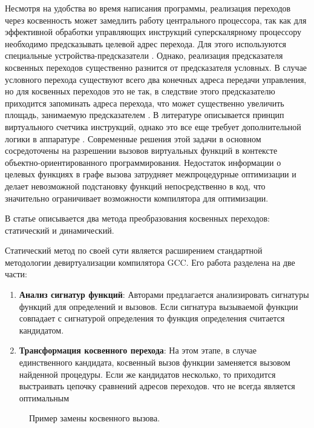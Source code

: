  Несмотря на удобства во время написания программы, реализация переходов через косвенность  может замедлить работу центрального процессора, так как для эффективной обработки управляющих инструкций суперскалярному процессору необходимо предсказывать целевой адрес перехода. Для этого используются специальные устройства-предсказатели \cite{mcfarling1993combining,mittal2019survey}. Однако, реализация предсказателя косвенных переходов существенно разнится от предсказателя условных. В случае условного перехода существуют всего два конечных адреса передачи управления, но для косвенных переходов это не так, в следствие этого предсказателю приходится запоминать адреса перехода, что может существенно увеличить площадь, занимаемую предсказателем \cite{driesen1998accurate}. В литературе описывается принцип виртуального счетчика инструкций, однако это все еще требует дополнительной логики в аппаратуре \cite{redmond2007vpc}.
 Современные решения этой задачи в основном сосредоточены на разрешении вызовов виртуальных функций в контексте объектно-ориентированного программирования. Недостаток информации о целевых функциях в графе вызова затрудняет межпроцедурные оптимизации и делает невозможной подстановку функций непосредственно в код, что значительно ограничивает возможности компилятора для оптимизации. \cite{li2010lightweight,pande1996data}



В статье \cite{chernonog2023статический} описывается два метода преобразования косвенных переходов: статический и динамический.  

Статический метод по своей сути является расширением стандартной методологии девиртуализации компилятора GCC. Его работа разделена на две части:

\begin{enumerate}
	\item \textbf{Анализ сигнатур функций}: Авторами предлагается анализировать сигнатуры функций для определений и вызовов. Если сигнатура вызываемой функции совпадает с сигнатурой определения то функция определения считается кандидатом.
	\item \textbf{Трансформация косвенного перехода}: На этом этапе, в случае единственного кандидата, косвенный вызов функции заменяется вызовом найденной процедуры. Если же кандидатов несколько, то приходится выстраивать цепочку сравнений адресов переходов. что не всегда является оптимальным
\end{enumerate}


\begin{figure}[ht]
	\caption{Пример замены косвенного вызова.}\label{fig:ICP1}
\end{figure}

